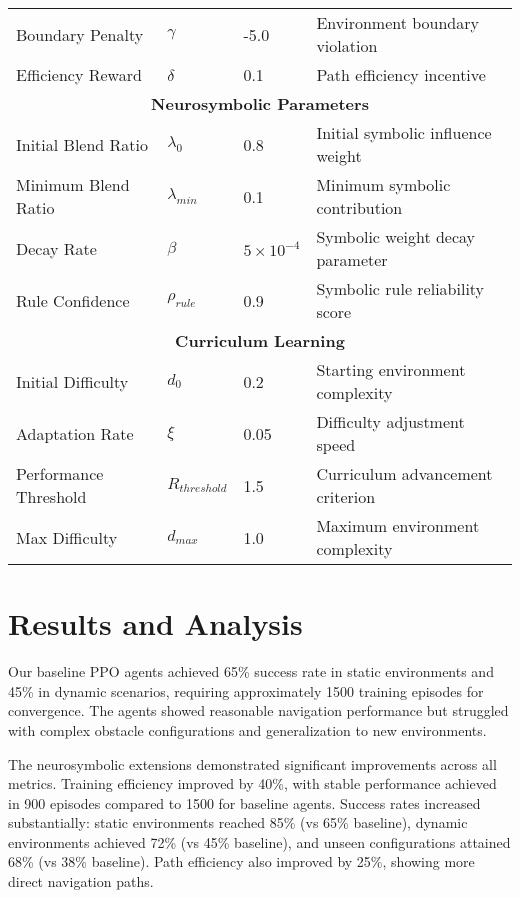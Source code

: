 \documentclass[pdflatex,sn-mathphys-num]{sn-jnl}
\theoremstyle{thmstyleone}%
\theoremstyle{thmstyletwo}%
\theoremstyle{thmstylethree}%
\begin{document}
\begin{table}[h]
\begin{tabular}{llll}
Boundary Penalty & $\gamma$ & -5.0 & Environment boundary violation \\
Efficiency Reward & $\delta$ & 0.1 & Path efficiency incentive \\
\hline
\multicolumn{4}{c}{\textbf{Neurosymbolic Parameters}} \\
\hline
Initial Blend Ratio & $\lambda_0$ & 0.8 & Initial symbolic influence weight \\
Minimum Blend Ratio & $\lambda_{min}$ & 0.1 & Minimum symbolic contribution \\
Decay Rate & $\beta$ & $5 \times 10^{-4}$ & Symbolic weight decay parameter \\
Rule Confidence & $\rho_{rule}$ & 0.9 & Symbolic rule reliability score \\
\hline
\multicolumn{4}{c}{\textbf{Curriculum Learning}} \\
\hline
Initial Difficulty & $d_0$ & 0.2 & Starting environment complexity \\
Adaptation Rate & $\xi$ & 0.05 & Difficulty adjustment speed \\
Performance Threshold & $R_{threshold}$ & 1.5 & Curriculum advancement criterion \\
Max Difficulty & $d_{max}$ & 1.0 & Maximum environment complexity \\
\hline
\end{tabular}
\label{tab:hyperparameters}
\end{table}

\section{Results and Analysis}

Our baseline PPO agents achieved 65\% success rate in static environments and 45\% in dynamic scenarios, requiring approximately 1500 training episodes for convergence. The agents showed reasonable navigation performance but struggled with complex obstacle configurations and generalization to new environments.

The neurosymbolic extensions demonstrated significant improvements across all metrics. Training efficiency improved by 40\%, with stable performance achieved in 900 episodes compared to 1500 for baseline agents. Success rates increased substantially: static environments reached 85\% (vs 65\% baseline), dynamic environments achieved 72\% (vs 45\% baseline), and unseen configurations attained 68\% (vs 38\% baseline). Path efficiency also improved by 25\%, showing more direct navigation paths.
\end{document}
